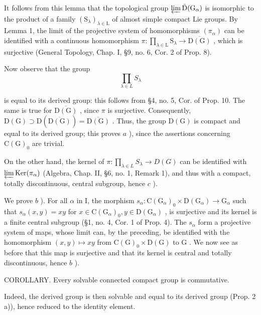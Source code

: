 It follows from this lemma that the topological group \(\varprojlim\tilde{\mathrm{D}}(\mathrm{G}_{\alpha})\) is isomorphic to the product of a family \((\mathrm{S}_{\lambda})_{\lambda\in\mathrm{L}}\) of almost simple compact Lie groups. By Lemma 1, the limit of the projective system of homomorphisms \((\pi_{\alpha})\) can be identified with a continuous homomorphism \(\pi:\prod_{\lambda\in\mathrm{L}}\mathrm{S}_{\lambda}\to\overline{\mathrm{D}(\mathrm{G})}\) , which is surjective (General Topology, Chap. I, §9, no. 6, Cor. 2 of Prop. 8).

Now observe that the group
\[
\prod_ {\lambda \in L} S _ {\lambda}
\]

is equal to its derived group: this follows from §4, no. 5, Cor. of Prop. 10. The same is true for \(\overline{\mathrm{D(G)}}\) , since \(\pi\) is surjective. Consequently, \(\mathrm{D(G)} \supset \mathrm{D}(\overline{\mathrm{D(G)}}) = \overline{\mathrm{D(G)}}\) . Thus, the group \(\mathrm{D(G)}\) is compact and equal to its derived group; this proves \(a\) ), since the assertions concerning \(\mathrm{C(G)}_0\) are trivial.

On the other hand, the kernel of \(\pi : \prod_{\lambda \in L} S_{\lambda} \to D(G)\) can be identified with \(\varprojlim \operatorname{Ker}(\pi_{\alpha})\) (Algebra, Chap. II, §6, no. 1, Remark 1), and thus with a compact, totally discontinuous, central subgroup, hence \(c\) ).

We prove \(b\) ). For all \(\alpha\) in I, the morphism \(s_{\alpha}: \mathrm{C}(\mathrm{G}_{\alpha})_0 \times \mathrm{D}(\mathrm{G}_{\alpha}) \to \mathrm{G}_{\alpha}\) such that \(s_{\alpha}(x,y) = xy\) for \(x \in \mathrm{C}(\mathrm{G}_{\alpha})_0, y \in \mathrm{D}(\mathrm{G}_{\alpha})\) , is surjective and its kernel is a finite central subgroup (§1, no. 4, Cor. 1 of Prop. 4). The \(s_{\alpha}\) form a projective system of maps, whose limit can, by the preceding, be identified with the homomorphism \((x,y) \mapsto xy\) from \(\mathrm{C}(\mathrm{G})_0 \times \mathrm{D}(\mathrm{G})\) to \(\mathrm{G}\) . We now see as before that this map is surjective and that its kernel is central and totally discontinuous, hence \(b\) ).

COROLLARY. Every solvable connected compact group is commutative.

Indeed, the derived group is then solvable and equal to its derived group (Prop. 2 a)), hence reduced to the identity element.

